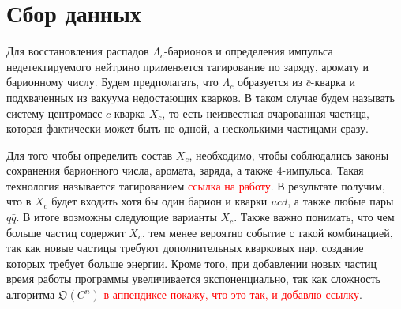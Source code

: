 \section{Сбор данных}

Для восстановления распадов $\Lambda_c$-барионов и определения импульса недетектируемого нейтрино применяется тагирование по заряду, аромату и барионному числу. Будем предполагать, что $\Lambda_c$ образуется из $\bar{c}$-кварка и подхваченных из вакуума недостающих кварков. В таком случае будем называть систему центромасс $c$-кварка $X_c$, то есть неизвестная очарованная частица, которая фактически может быть не одной, а несколькими частицами сразу.

\begin{figure}[h!]
    \centering
\end{figure}

Для того чтобы определить состав $X_c$, необходимо, чтобы соблюдались законы сохранения барионного числа, аромата, заряда, а также 4-импульса. Такая технология называется тагированием \textcolor{red}{ссылка на работу}. В результате получим, что в $X_c$ будет входить хотя бы один барион и кварки $u c d$, а также любые пары $q \bar{q}$. В итоге возможны следующие варианты $X_c$. Также важно понимать, что чем больше частиц содержит $X_c$, тем менее вероятно событие с такой комбинацией, так как новые частицы требуют дополнительных кварковых пар, создание которых требует больше энергии. Кроме того, при добавлении новых частиц время работы программы увеличивается экспоненциально, так как сложность алгоритма $\mathfrak{O}(C^n)$ \textcolor{red}{в аппендиксе покажу, что это так, и добавлю ссылку}.

